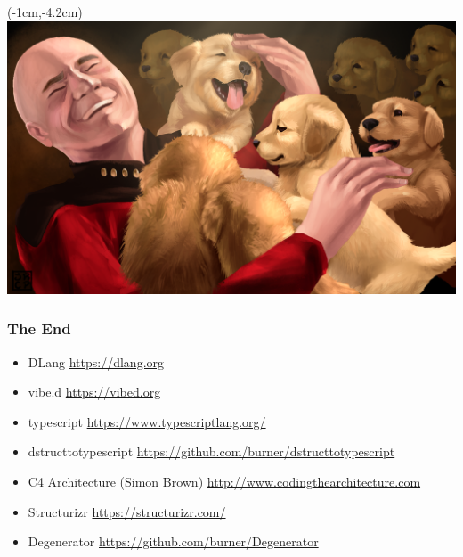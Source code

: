 \documentclass[xelatex,10pt]{beamer}
\begin{document}
\begin{frame}[plain]
\begin{textblock*}{0cm}(-1cm,-4.2cm)
	\includegraphics[width=1.0\paperwidth]{picardpuppy.png}
\end{textblock*}
\end{frame}

\begin{frame}
	\frametitle{The End}
	\begin{itemize}
		\item DLang \url{https://dlang.org}
		\item vibe.d \url{https://vibed.org}
		\item typescript \url{https://www.typescriptlang.org/}
		\item dstructtotypescript
			\url{https://github.com/burner/dstructtotypescript}
		\item C4 Architecture (Simon Brown) \url{http://www.codingthearchitecture.com}
		\item Structurizr \url{https://structurizr.com/}
		\item Degenerator \url{https://github.com/burner/Degenerator}
	\end{itemize}
\end{frame}
\end{document}
